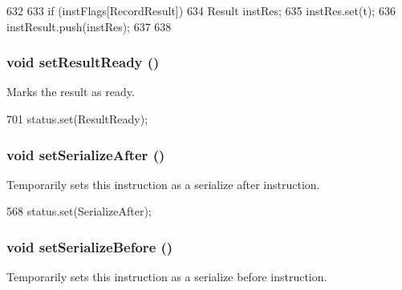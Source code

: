 \begin{DoxyCode}
632     {
633         if (instFlags[RecordResult]) {
634             Result instRes;
635             instRes.set(t);
636             instResult.push(instRes);
637         }
638     }
\end{DoxyCode}
\hypertarget{classBaseDynInst_a142437d4d0962c5b61960661f5141891}{
\subsubsection[{setResultReady}]{\setlength{\rightskip}{0pt plus 5cm}void setResultReady ()}}
\label{classBaseDynInst_a142437d4d0962c5b61960661f5141891}
Marks the result as ready. 


\begin{DoxyCode}
701 { status.set(ResultReady); }
\end{DoxyCode}
\hypertarget{classBaseDynInst_a3e4776abfedcc80df8c826a7f3c3efd3}{
\subsubsection[{setSerializeAfter}]{\setlength{\rightskip}{0pt plus 5cm}void setSerializeAfter ()}}
\label{classBaseDynInst_a3e4776abfedcc80df8c826a7f3c3efd3}
Temporarily sets this instruction as a serialize after instruction. 


\begin{DoxyCode}
568 { status.set(SerializeAfter); }
\end{DoxyCode}
\hypertarget{classBaseDynInst_a820fdb5f79e789fc8efffb15f1995695}{
\subsubsection[{setSerializeBefore}]{\setlength{\rightskip}{0pt plus 5cm}void setSerializeBefore ()}}
\label{classBaseDynInst_a820fdb5f79e789fc8efffb15f1995695}
Temporarily sets this instruction as a serialize before instruction. 


